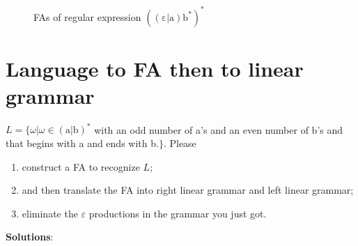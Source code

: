 \documentclass[scheme=plain,12pt]{ctexart}
\begin{document}
\begin{figure}[hp]
{{
            }
            \label{fig:t2-3-3}
        }
        \caption{FAs of regular expression $(\mathrm{(\varepsilon|a)b^*})^*$}
        \label{fig:t2-3}
    \end{figure}

    \clearpage
    \newpage
    \section{Language to FA then to linear grammar}

    $L = \{\omega | \omega\in(\mathrm{a}|\mathrm{b})^*$ with an odd number of a's and an even number of b's and that begins with a and ends with b.$\}$. Please

    \begin{enumerate}
        \item construct a FA to recognize $L$;
        \item and then translate the FA into right linear grammar and left linear grammar;
        \item eliminate the $\varepsilon$ productions in the grammar you just got.
    \end{enumerate}

    \textbf{Solutions}:
\end{document}
